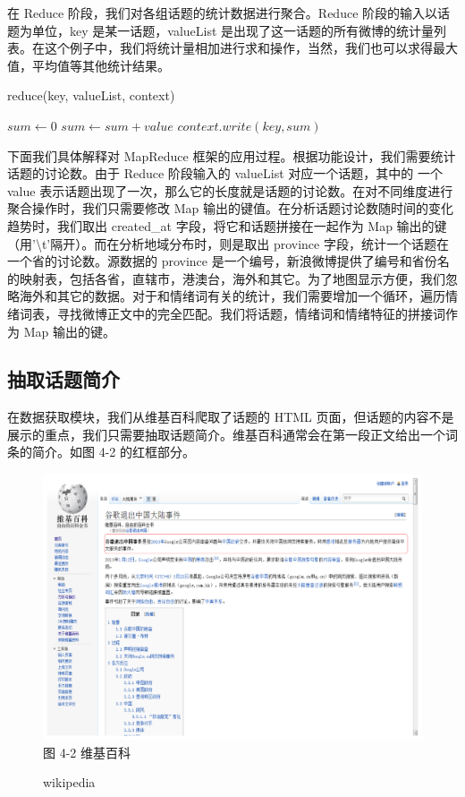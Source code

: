 在 Reduce 阶段，我们对各组话题的统计数据进行聚合。Reduce 阶段的输入以话题为单位，key 是某一话题，valueList 是出现了这一话题的所有微博的统计量列表。在这个例子中，我们将统计量相加进行求和操作，当然，我们也可以求得最大值，平均值等其他统计结果。

\begin{algorithm}
\caption{reduce(key, valueList, context)}
\label{alg2}
\begin{algorithmic}[1]
\STATE $sum \leftarrow 0$
\STATE $sum \leftarrow sum + value$
\ENDFOR
\STATE $context.write(key, sum)$
\end{algorithmic}
\end{algorithm}

下面我们具体解释对 MapReduce 框架的应用过程。根据功能设计，我们需要统计话题的讨论数。由于 Reduce 阶段输入的 valueList 对应一个话题，其中的 一个 value 表示话题出现了一次，那么它的长度就是话题的讨论数。在对不同维度进行聚合操作时，我们只需要修改 Map 输出的键值。在分析话题讨论数随时间的变化趋势时，我们取出 created\_at 字段，将它和话题拼接在一起作为 Map 输出的键（用'\textbackslash t'隔开）。而在分析地域分布时，则是取出 province 字段，统计一个话题在一个省的讨论数。源数据的 province 是一个编号，新浪微博提供了编号和省份名的映射表，包括各省，直辖市，港澳台，海外和其它。为了地图显示方便，我们忽略海外和其它的数据。对于和情绪词有关的统计，我们需要增加一个循环，遍历情绪词表，寻找微博正文中的完全匹配。我们将话题，情绪词和情绪特征的拼接词作为 Map 输出的键。 

\subsection{抽取话题简介}
在数据获取模块，我们从维基百科爬取了话题的 HTML 页面，但话题的内容不是展示的重点，我们只需要抽取话题简介。维基百科通常会在第一段正文给出一个词条的简介。如图 4-2 的红框部分。

\begin{figure}[t]
\centering
\includegraphics[width=\textwidth, height=0.4\textheight]{wikipedia}
图 4-2 维基百科
\caption{wikipedia}
\end{figure}

